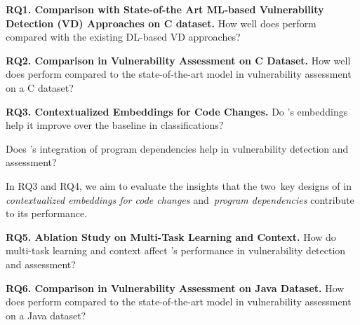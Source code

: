 

\vspace{1pt}
\noindent\textbf{RQ1. Comparison with State-of-the Art ML-based Vulnerability
Detection (VD) Approaches on C dataset.} How well does {\tool} perform
compared with the existing DL-based VD approaches?

\vspace{1pt}
\noindent\textbf{RQ2. Comparison in Vulnerability Assessment on C
  Dataset.} How well does {\tool} perform compared to the
state-of-the-art model in vulnerability assessment on a C dataset?


\noindent\textbf{RQ3. Contextualized Embeddings for Code Changes.} Do {\tool}'s embeddings help it improve over the
baseline in classifications?


 Does {\tool}'s integration
of program dependencies help in vulnerability detection and
assessment?

In RQ3 and RQ4, we aim to evaluate the insights that the two~key
  designs of {\tool} in {\em contextualized embeddings for code
  changes} and~{\em program dependencies} contribute to its performance.


\noindent\textbf{RQ5. Ablation Study on Multi-Task Learning and Context.} How do multi-task
learning and context affect {\tool}'s performance in vulnerability
detection and assessment?

\vspace{1pt}
\noindent\textbf{RQ6. Comparison in Vulnerability Assessment on Java
  Dataset.} How does {\tool} perform compared to the
state-of-the-art model in vulnerability assessment on a Java dataset?
